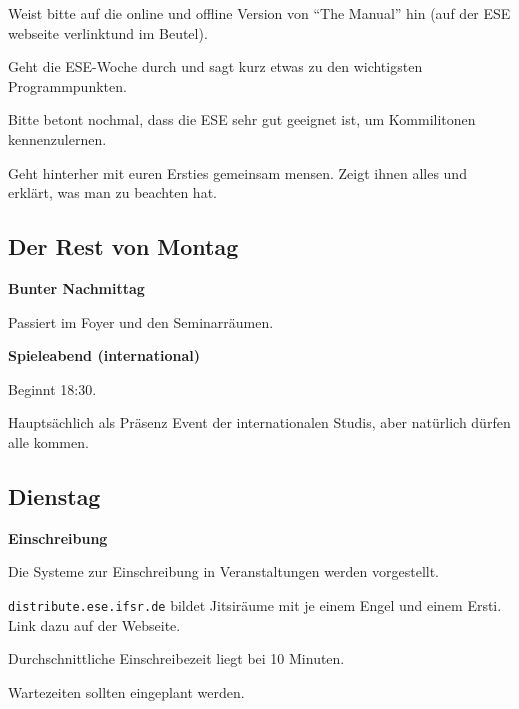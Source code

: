 \documentclass[a4paper,12pt]{scrreprt}
\begin{document}
\begin{itemize*}
    \item Weist bitte auf die online und offline Version von \enquote{The Manual} hin (auf der ESE webseite verlinktund im Beutel).
    \item Geht die ESE-Woche durch und sagt kurz etwas zu den wichtigsten Programmpunkten.
    \item Bitte betont nochmal, dass die ESE sehr gut geeignet ist, um Kommilitonen kennenzulernen.
    \item Geht hinterher mit euren Ersties gemeinsam mensen. Zeigt ihnen alles und erklärt, was man zu beachten hat.
\end{itemize*}


\subsection{Der Rest von Montag}

\textbf{Bunter Nachmittag}
\begin{itemize*}
    \item Passiert im Foyer und den Seminarräumen.
\end{itemize*}

\textbf{Spieleabend (international)}
\begin{itemize*}
    \item Beginnt 18:30.
    \item Hauptsächlich als Präsenz Event der internationalen Studis, aber natürlich dürfen alle kommen.
\end{itemize*}


\subsection{Dienstag}

\textbf{Einschreibung}
\begin{itemize*}
    \item Die Systeme zur Einschreibung in Veranstaltungen werden vorgestellt.
    \item \texttt{distribute.ese.ifsr.de} bildet Jitsiräume mit je einem Engel und einem Ersti. Link dazu auf der Webseite.
    \item Durchschnittliche Einschreibezeit liegt bei 10 Minuten.
    \item Wartezeiten sollten eingeplant werden.
\end{itemize*}
\end{document}
